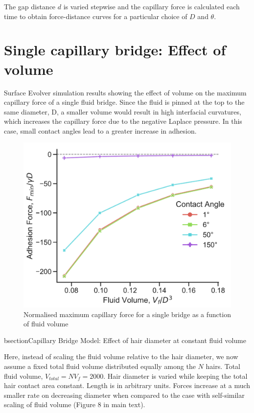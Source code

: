 \documentclass[english]{achemso}
\begin{document}
The gap distance $d$ is varied stepwise and the capillary force is
calculated each time to obtain force-distance curves for a particular
choice of $D$ and $\theta$. 

\section{Single capillary bridge: Effect of volume}

Surface Evolver simulation results showing the effect of volume on
the maximum capillary force of a single fluid bridge. Since the fluid
is pinned at the top to the same diameter, D, a smaller volume would
result in high interfacial curvatures, which increases the capillary
force due to the negative Laplace pressure. In this case, small contact
angles lead to a greater increase in adhesion.

\begin{figure}[H]

\begin{centering}
\includegraphics{FigureS2-Effect_of_fluid_volume}\caption{Normalised maximum capillary force for a single bridge as a function
of fluid volume}
\par\end{centering}
\end{figure}


bsection{Capillary Bridge Model: Effect of hair diameter at constant fluid
volume}

Here, instead of scaling the fluid volume relative to the hair diameter,
we now assume a fixed total fluid volume distributed equally among
the $N$ hairs. Total fluid volume, $V_{total}=NV_{f}=2000$. Hair
diameter is varied while keeping the total hair contact area constant.
Length is in arbitrary units. Forces increase at a much smaller rate
on decreasing diameter when compared to the case with self-similar
scaling of fluid volume (Figure 8 in main text).
\end{document}
